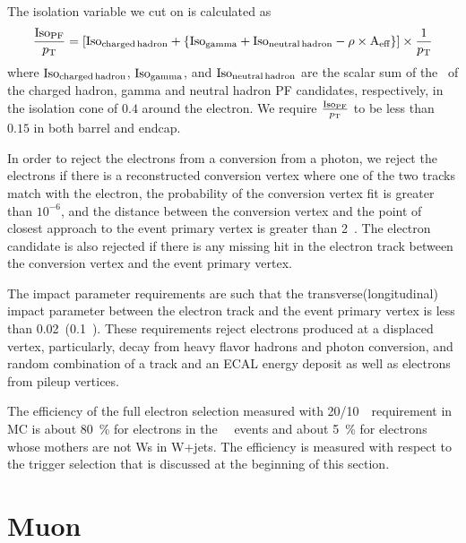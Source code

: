 The isolation variable we cut on is calculated as 
\begin{equation}
\frac{\rm{Iso}_{PF}}{p_\mathrm{T}}
=
\left[ \rm{Iso}_{charged \, hadron} + \left\{ \rm{Iso}_{gamma} 
       + \rm{Iso}_{neutral \, hadron} -\rho \times \textrm{A}_{\textrm{eff}} \right\} \right]
\times \frac{1}{p_\mathrm{T}}
\end{equation}
where $\rm{Iso}_{charged \, hadron}$, $\rm{Iso}_{gamma}$, and $\rm{Iso}_{neutral \, hadron}$ 
are the scalar sum of the \pt\ of the charged hadron, gamma and neutral hadron PF candidates, 
respectively, in the isolation cone of $0.4$ around the electron.
We require $\frac{\rm{Iso}_{PF}}{p_\mathrm{T}}$ to be less than $0.15$ in both barrel and endcap.  

In order to reject the electrons from a conversion from a photon, we reject the electrons
if there is a reconstructed conversion vertex where one of the two tracks match with 
the electron, the probability of the conversion vertex fit is greater than $10^{-6}$, 
and the distance between the conversion vertex and the point of closest approach 
to the event primary vertex is greater than 2~\cm.
The electron candidate is also rejected if there is any missing hit in the electron track 
between the conversion vertex and the event primary vertex.   

The impact parameter requirements are such that the transverse(longitudinal) 
impact parameter between the electron track and the event primary vertex 
is less than 0.02~\cm(0.1~\cm). 
These requirements reject electrons produced at a displaced vertex, 
particularly, decay from heavy flavor hadrons and photon conversion, 
and random combination of a track and an ECAL energy deposit 
as well as electrons from pileup vertices. 

The efficiency of the full electron selection measured with 20/10~\GeV\ requirement 
in MC is about 80~\% for electrons in the ~\GeV\ events 
and about 5~\% for electrons whose mothers are not Ws in W+jets.
The efficiency is measured with respect to the trigger selection that is 
discussed at the beginning of this section.

\section{ Muon }

